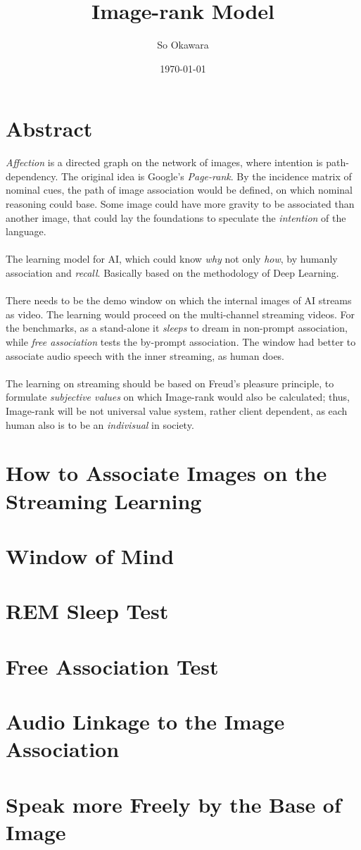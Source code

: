 \documentclass[a4paper, twocolumn,10pt]{article}
\author{So Okawara}
\date{\today}
\title{Image-rank Model}
\begin{document}
\maketitle
\section{Abstract}
\emph{Affection} is a directed graph on the network of images, where intention is path-dependency. The original idea is Google's \emph{Page-rank}. By the incidence matrix of nominal cues, the path of image association would be defined, on which nominal reasoning could base. Some image could have more gravity to be associated than another image, that could lay the foundations to speculate the \emph{intention} of the language.\\\\
The learning model for AI, which could know \emph{why} not only \emph{how}, by humanly association and \emph{recall}. Basically based on the methodology of Deep Learning.\\\\
There needs to be the demo window on which the internal images of AI streams as video. The learning would proceed on the multi-channel streaming videos. For the benchmarks, as a stand-alone it \emph{sleeps} to dream in non-prompt association, while \emph{free association} tests the by-prompt association. The window had better to associate audio speech with the inner streaming, as human does.\\\\
The learning on streaming should be based on Freud's pleasure principle, to formulate \emph{subjective values} on which Image-rank would also be calculated; thus, Image-rank will be not universal value system, rather client dependent, as each human also is to be an \emph{indivisual} in society.
\section{How to Associate Images on the Streaming Learning}
\section{Window of Mind}
\section{REM Sleep Test}
\section{Free Association Test}
\section{Audio Linkage to the Image Association}
\section{Speak more Freely by the Base of Image}
\end{document}
